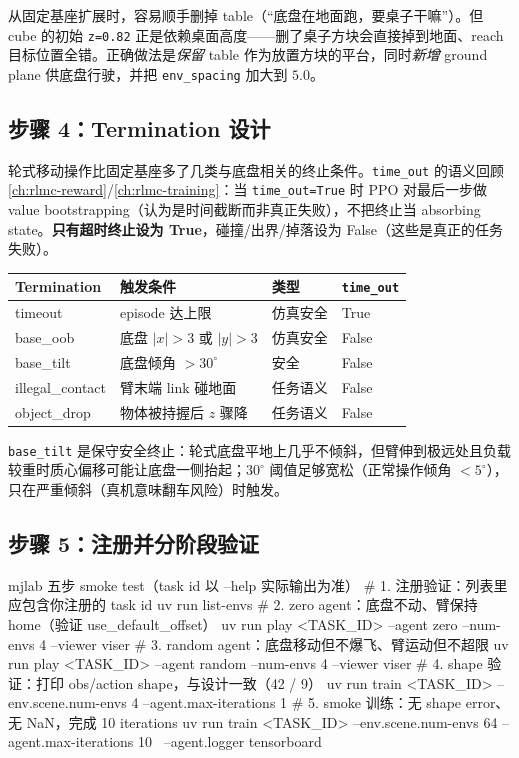 \begin{note}[保留桌子：cube 初始 \texttt{z=0.82} 依赖桌面高度]
从固定基座扩展时，容易顺手删掉 table（“底盘在地面跑，要桌子干嘛”）。但 cube 的初始 \verb|z=0.82| 正是依赖桌面高度——删了桌子方块会直接掉到地面、reach 目标位置全错。正确做法是\emph{保留} table 作为放置方块的平台，同时\emph{新增} ground plane 供底盘行驶，并把 \verb|env_spacing| 加大到 $5.0$。
\end{note}

\subsection{步骤 4：Termination 设计}
\label{sec:rlmc-wh-termination}

轮式移动操作比固定基座多了几类与底盘相关的终止条件。\verb|time_out| 的语义回顾 \cref{ch:rlmc-reward}/\cref{ch:rlmc-training}：当 \verb|time_out=True| 时 PPO 对最后一步做 value bootstrapping（认为是时间截断而非真正失败），不把终止当 absorbing state。\textbf{只有超时终止设为 True}，碰撞/出界/掉落设为 False（这些是真正的任务失败）。

\begin{center}
\small
\begin{tabular}{@{}llll@{}}
\toprule
Termination & 触发条件 & 类型 & \verb|time_out| \\
\midrule
timeout & episode 达上限 & 仿真安全 & True \\
base\_oob & 底盘 $|x|>3$ 或 $|y|>3$ & 仿真安全 & False \\
base\_tilt & 底盘倾角 $>30^\circ$ & 安全 & False \\
illegal\_contact & 臂末端 link 碰地面 & 任务语义 & False \\
object\_drop & 物体被持握后 $z$ 骤降 & 任务语义 & False \\
\bottomrule
\end{tabular}
\end{center}

\verb|base_tilt| 是保守安全终止：轮式底盘平地上几乎不倾斜，但臂伸到极远处且负载较重时质心偏移可能让底盘一侧抬起；$30^\circ$ 阈值足够宽松（正常操作倾角 $<5^\circ$），只在严重倾斜（真机意味翻车风险）时触发。

\subsection{步骤 5：注册并分阶段验证}
\label{sec:rlmc-wh-verify}

\begin{codebox}[bash]{mjlab 五步 smoke test（task id 以 --help 实际输出为准）}
# 1. 注册验证：列表里应包含你注册的 task id
uv run list-envs
# 2. zero agent：底盘不动、臂保持 home（验证 use_default_offset）
uv run play <TASK_ID> --agent zero --num-envs 4 --viewer viser
# 3. random agent：底盘移动但不爆飞、臂运动但不超限
uv run play <TASK_ID> --agent random --num-envs 4 --viewer viser
# 4. shape 验证：打印 obs/action shape，与设计一致（42 / 9）
uv run train <TASK_ID> --env.scene.num-envs 4 --agent.max-iterations 1
# 5. smoke 训练：无 shape error、无 NaN，完成 10 iterations
uv run train <TASK_ID> --env.scene.num-envs 64 --agent.max-iterations 10 \
  --agent.logger tensorboard
\end{codebox}

